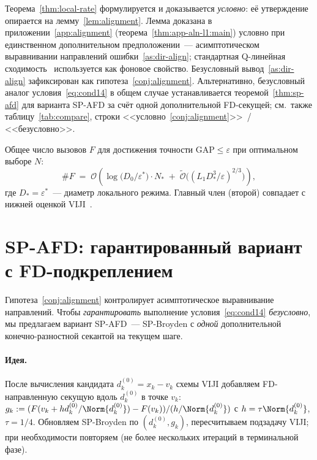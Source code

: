 \begin{remark}
\label{rem:thm-conditional}
Теорема~\ref{thm:local-rate} формулируется и доказывается \emph{условно}:
её утверждение опирается на лемму~\ref{lem:alignment}. Лемма доказана в
приложении~\ref{app:alignment} (теорема~\ref{thm:app-aln-l1:main}) условно
при единственном дополнительном предположении~--- асимптотическом
выравнивании направлений ошибки~\ref{as:dir-align}; стандартная
Q-линейная сходимость~\cite[Theorem~3.4]{Agafonov2024VIJI} используется
как фоновое свойство. Безусловный вывод~\ref{as:dir-align}
зафиксирован как гипотеза~\ref{conj:alignment}. Альтернативно,
безусловный аналог условия~\eqref{eq:cond14} в общем случае
устанавливается теоремой~\ref{thm:sp-afd} для варианта SP-AFD за счёт
одной дополнительной FD-секущей; см.\ также таблицу~\ref{tab:compare},
строки <<условно~\ref{conj:alignment}>>~/\,<<безусловно>>.
\end{remark}

\begin{corollary}
\label{cor:complexity}
Общее число вызовов $F$ для достижения точности $\mathrm{GAP} \le \varepsilon$
при оптимальном выборе $N$:
\[
\#F
\;=\;
\mathcal O\!\left(
    \log\!\big(D_0 / \varepsilon^{*}\big) \cdot N_{*}
    \;+\;
    \tilde{\mathcal O}\!\big((L_1 D_{*}^3 / \varepsilon)^{2/3}\big)
\right),
\]
где $D_{*} = \varepsilon^{*}$~--- диаметр локального режима. Главный член
(второй) совпадает с нижней оценкой VIJI~\cite{Agafonov2024VIJI}.
\end{corollary}

\section{SP-AFD: гарантированный вариант с FD-подкреплением}
\label{sec:viji:sp-afd-fallback}

Гипотеза~\ref{conj:alignment} контролирует асимптотическое выравнивание
направлений. Чтобы \emph{гарантировать} выполнение условия~\eqref{eq:cond14}
\emph{безусловно}, мы предлагаем вариант SP-AFD~--- SP-Broyden с
\emph{одной} дополнительной конечно-разностной секантой на текущем шаге.

\paragraph{Идея.} После вычисления кандидата $d^{(0)}_{k} = x_k - v_k$
схемы VIJI добавляем FD-направленную секущую вдоль $d^{(0)}_k$ в точке $v_k$:
$g_k := (F(v_k + h d^{(0)}_k / \Norm{d^{(0)}_k}) - F(v_k)) / (h/\Norm{d^{(0)}_k})$
с $h = \tau \Norm{d^{(0)}_k}$, $\tau = 1/4$. Обновляем SP-Broyden по
$(d^{(0)}_k, g_k)$, пересчитываем подзадачу VIJI; при необходимости
повторяем (не более нескольких итераций в терминальной фазе).

